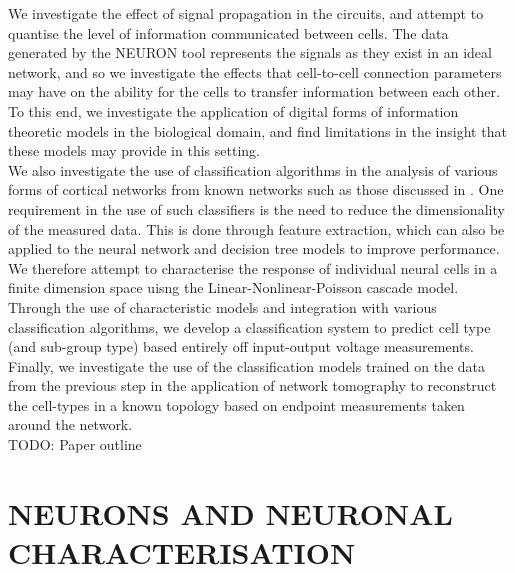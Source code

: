 \documentclass[letterpaper, 10 pt, conference]{ieeeconf}  %
\begin{document}
We investigate the effect of signal propagation in the circuits, and attempt to quantise the level of information communicated between cells. The data generated by the NEURON tool represents the signals as they exist in an ideal network, and so we investigate the effects that cell-to-cell connection parameters may have on the ability for the cells to transfer information between each other. To this end, we investigate the application of digital forms of information theoretic models in the biological domain, and find limitations in the insight that these models may provide in this setting.\\
We also investigate the use of classification algorithms in the analysis of various forms of cortical networks from known networks such as those discussed in \cite{bbpTop}. One requirement in the use of such classifiers is the need to reduce the dimensionality of the measured data. This is done through feature extraction, which can also be applied to the neural network and decision tree models to improve performance. We therefore attempt to characterise the response of individual neural cells in a finite dimension space uisng the Linear-Nonlinear-Poisson cascade model. Through the use of characteristic models and integration with various classification algorithms, we develop a classification system to predict cell type (and sub-group type) based entirely off input-output voltage measurements.\\
Finally, we investigate the use of the classification models trained on the data from the previous step in the application of network tomography to reconstruct the cell-types in a known topology based on endpoint measurements taken around the network.\\
TODO: Paper outline

\section{NEURONS AND NEURONAL CHARACTERISATION}
\end{document}
